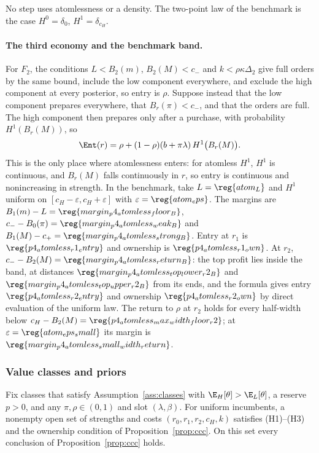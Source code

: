 No step uses atomlessness or a density. The two-point law of the benchmark is the case \(H^0=\delta_0\),
\(H^1=\delta_{c_H}\).

\paragraph{The third economy and the benchmark band.}
For \(F_2\), the conditions \(L<B_2(m)\), \(B_2(M)<c_-\) and \(k<\rho\kappa\Delta_2\) give full orders by the same
bound, include the low component everywhere, and exclude the high component at every posterior, so entry is
\(\rho\). Suppose instead that the low component prepares everywhere, that \(B_r(\pi)<c_-\), and that the orders are
full. The high component then prepares only after a purchase, with probability \(H^1(B_r(M))\), so
\[
\Ent(r)=\rho+(1-\rho)(b+\pi\lambda)\,H^1\bigl(B_r(M)\bigr).
\]
This is the only place where atomlessness enters: for atomless \(H^1\), \(H^1\) is continuous, and \(B_r(M)\) falls
continuously in \(r\), so entry is continuous and nonincreasing in strength. In the benchmark, take
\(L=\reg{atom_L}\) and \(H^1\) uniform on \([c_H-\varepsilon,c_H+\varepsilon]\) with \(\varepsilon=\reg{atom_eps}\).
The margins are \(B_1(m)-L=\reg{margin_p4_atomless_floor_B}\), \(c_--B_0(\pi)=\reg{margin_p4_atomless_weak_B}\) and
\(B_1(M)-c_+=\reg{margin_p4_atomless_strong_B}\). Entry at \(r_1\) is \(\reg{p4_atomless_r1_entry}\) and ownership
is \(\reg{p4_atomless_r1_own}\). At \(r_2\), \(c_--B_2(M)=\reg{margin_p4_atomless_return_B}\): the top profit lies
inside the band, at distances \(\reg{margin_p4_atomless_top_lower_r2_B}\) and \(\reg{margin_p4_atomless_top_upper_r2_B}\)
from its ends, and the formula gives entry \(\reg{p4_atomless_r2_entry}\) and ownership \(\reg{p4_atomless_r2_own}\) by
direct evaluation of the uniform law. The return to \(\rho\) at \(r_2\) holds for every half-width below
\(c_H-B_2(M)=\reg{p4_atomless_max_width_floor_r2}\); at \(\varepsilon=\reg{atom_eps_small}\) its margin is
\(\reg{margin_p4_atomless_small_width_return}\).

\subsubsection*{Value classes and priors}

\begin{proposition}\label{prop:classes}
Fix classes that satisfy Assumption~\ref{ass:classes} with \(\E_H[\theta]>\E_L[\theta]\), a reserve \(p>0\), and
any \(\pi,\rho\in(0,1)\) and slot \((\lambda,\beta)\). For uniform incumbents, a nonempty open set of strengths and
costs \((r_0,r_1,r_2,c_H,k)\) satisfies (H1)--(H3) and the ownership condition of Proposition~\ref{prop:ccc}. On this
set every conclusion of Proposition~\ref{prop:ccc} holds.
\end{proposition}

